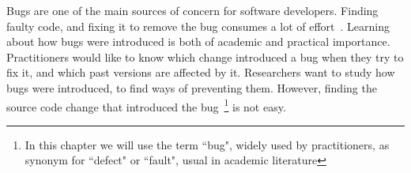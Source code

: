 
Bugs are one of the main sources of concern for software developers. Finding faulty code, and fixing it to remove the bug consumes a lot of effort~\cite{kim2006long,weiss2007long}. Learning about how bugs were introduced is both of academic and practical importance. Practitioners would like to know which change introduced a bug when they try to fix it, and which past versions are affected by it. Researchers want to study how bugs were introduced, to find ways of preventing them. However, finding the source code change that introduced the bug~\footnote{In this chapter we will use the term ``bug", widely used by practitioners, as synonym for ``defect" or ``fault", usual in academic literature\cite{5399061,1335465,tan2014bug}} is not easy.



